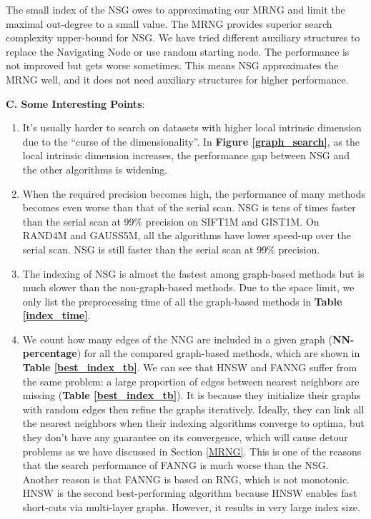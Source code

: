 \documentclass{vldb}
\begin{document}
\begin{enumerate}
The small index of the NSG owes to approximating our MRNG and limit the maximal out-degree to a small value. The MRNG provides superior search complexity upper-bound for NSG. We have tried different auxiliary structures to replace the Navigating Node or use random starting node. The performance is not improved but gets worse sometimes. This means NSG approximates the MRNG well, and it does not need auxiliary structures for higher performance.
\end{enumerate}


\textbf{C. Some Interesting Points}:
\begin{enumerate}
\setlength{\itemsep}{1pt}
\setlength{\parskip}{0pt}
\setlength{\parsep}{0pt}
\item It's usually harder to search on datasets with higher local intrinsic dimension due to the ``curse of the dimensionality''. In \textbf{Figure \ref{graph_search}}, as the local intrinsic dimension increases, the performance gap between NSG and the other algorithms is widening.

\item When the required precision becomes high, the performance of many methods becomes even worse than that of the serial scan. NSG is tens of times faster than the serial scan at 99\% precision on SIFT1M and GIST1M. On RAND4M and GAUSS5M, all the algorithms have lower speed-up over the serial scan. NSG is still faster than the serial scan at 99\% precision.

\item The indexing of NSG is almost the fastest among graph-based methods but is much slower than the non-graph-based methods. Due to the space limit, we only list the preprocessing time of all the graph-based methods in \textbf{Table \ref{index_time}}. 

\item We count how many edges of the NNG are included in a given graph (\textbf{NN-percentage}) for all the compared graph-based methods, which are shown in \textbf{Table \ref{best_index_tb}}. We can see that HNSW and FANNG suffer from the same problem: a large proportion of edges between nearest neighbors are missing (\textbf{Table \ref{best_index_tb}}). It is because they initialize their graphs with random edges then refine the graphs iteratively. Ideally, they can link all the nearest neighbors when their indexing algorithms converge to optima, but they don't have any guarantee on its convergence, which will cause detour problems as we have discussed in Section \ref{MRNG}. This is one of the reasons that the search performance of FANNG is much worse than the NSG. Another reason is that FANNG is based on RNG, which is not monotonic. HNSW is the second best-performing algorithm because HNSW enables fast short-cuts via multi-layer graphs. However, it results in very large index size.


\end{enumerate}
\end{document}

